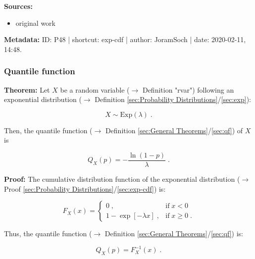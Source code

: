 \documentclass[a4paper,12pt]{book}
\begin{document}
\vspace{1em}
\textbf{Sources:}
\begin{itemize}
\item original work\end{itemize}


\vspace{1em}
\textbf{Metadata:} ID: P48 | shortcut: exp-cdf | author: JoramSoch | date: 2020-02-11, 14:48.


\subsubsection[\textbf{Quantile function}]{Quantile function} \label{sec:exp-qf}

\vspace{1em}
\textbf{Theorem:} Let $X$ be a random variable ($\rightarrow$ Definition "rvar") following an exponential distribution ($\rightarrow$ Definition \ref{sec:Probability Distributions}/\ref{sec:exp}):

\begin{equation} \label{eq:exp-qf-exp}
X \sim \mathrm{Exp}(\lambda) \; .
\end{equation}

Then, the quantile function ($\rightarrow$ Definition \ref{sec:General Theorems}/\ref{sec:qf}) of $X$ is

\begin{equation} \label{eq:exp-qf-exp-qf}
Q_X(p) = -\frac{\ln(1-p)}{\lambda} \; .
\end{equation}


\vspace{1em}
\textbf{Proof:} The cumulative distribution function of the exponential distribution ($\rightarrow$ Proof \ref{sec:Probability Distributions}/\ref{sec:exp-cdf}) is:

\begin{equation} \label{eq:exp-qf-exp-cdf}
F_X(x) = \left\{
\begin{array}{rl}
0 \; , & \text{if} \; x < 0 \\
1 - \exp[-\lambda x] \; , & \text{if} \; x \geq 0 \; .
\end{array}
\right.
\end{equation}

Thus, the quantile function ($\rightarrow$ Definition \ref{sec:General Theorems}/\ref{sec:qf}) is:

\begin{equation} \label{eq:exp-qf-exp-qf-s1}
Q_X(p) = F_X^{-1}(x) \; .
\end{equation}
\end{document}
